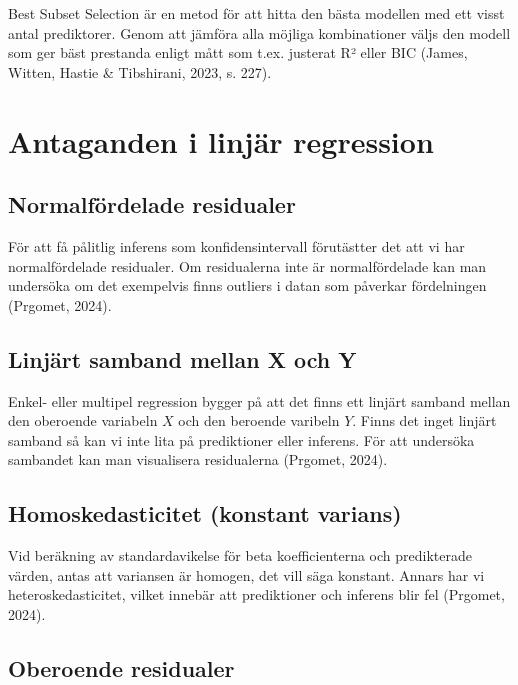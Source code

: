 \documentclass[
  letterpaper,
  DIV=11,
  numbers=noendperiod]{scrreprt}
\begin{document}
Best Subset Selection är en metod för att hitta den bästa modellen med
ett visst antal prediktorer. Genom att jämföra alla möjliga
kombinationer väljs den modell som ger bäst prestanda enligt mått som
t.ex. justerat R² eller BIC (James, Witten, Hastie \& Tibshirani, 2023,
s. 227).

\section{Antaganden i linjär
regression}\label{antaganden-i-linjuxe4r-regression}

\subsection{Normalfördelade
residualer}\label{normalfuxf6rdelade-residualer}

För att få pålitlig inferens som konfidensintervall förutästter det att
vi har normalfördelade residualer. Om residualerna inte är
normalfördelade kan man undersöka om det exempelvis finns outliers i
datan som påverkar fördelningen (Prgomet, 2024).

\subsection{Linjärt samband mellan X och
Y}\label{linjuxe4rt-samband-mellan-x-och-y}

Enkel- eller multipel regression bygger på att det finns ett linjärt
samband mellan den oberoende variabeln \(X\) och den beroende varibeln
\(Y\). Finns det inget linjärt samband så kan vi inte lita på
prediktioner eller inferens. För att undersöka sambandet kan man
visualisera residualerna (Prgomet, 2024).

\subsection{Homoskedasticitet (konstant
varians)}\label{homoskedasticitet-konstant-varians}

Vid beräkning av standardavikelse för beta koefficienterna och
predikterade värden, antas att variansen är homogen, det vill säga
konstant. Annars har vi heteroskedasticitet, vilket innebär att
prediktioner och inferens blir fel (Prgomet, 2024).

\subsection{Oberoende residualer}\label{oberoende-residualer}
\end{document}
